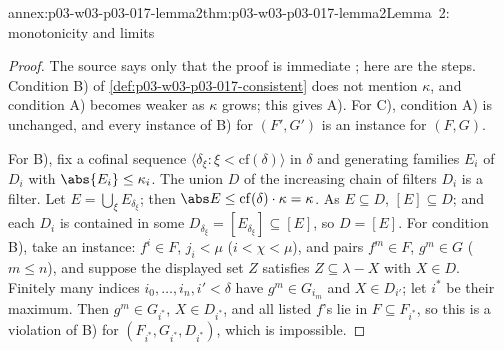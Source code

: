 \begin{annexitem}{annex:p03-w03-p03-017-lemma2}{thm:p03-w03-p03-017-lemma2}{Lemma~2: monotonicity and limits}
\begin{proof}
The source says only that the proof is immediate
\cite[p.~227]{Shelah1971Ultrapowers}; here are the steps.  Condition B) of
\cref{def:p03-w03-p03-017-consistent} does not mention \(\kappa\), and
condition A) becomes weaker as \(\kappa\) grows; this gives A).  For C),
condition A) is unchanged, and every instance of B) for \((F',G')\) is an
instance for \((F,G)\).

For B), fix a cofinal sequence \(\langle\delta_\xi:\xi<\mathrm{cf}(\delta)\rangle\)
in \(\delta\) and generating families \(E_i\) of \(D_i\) with
\(\abs{E_i}\le\kappa_i\).  The union \(D\) of the increasing chain of filters
\(D_i\) is a filter.  Let \(E=\bigcup_\xi E_{\delta_\xi}\); then
\(\abs E\le\mathrm{cf}(\delta)\cdot\kappa=\kappa\).  As \(E\subseteq D\),
\([E]\subseteq D\); and each \(D_i\) is contained in some
\(D_{\delta_\xi}=[E_{\delta_\xi}]\subseteq[E]\), so \(D=[E]\).  For condition
B), take an instance: \(f^i\in F\), \(j_i<\mu\) (\(i<\chi<\mu\)), and pairs
\(f^m\in F\), \(g^m\in G\) (\(m\le n\)), and suppose the displayed set \(Z\)
satisfies \(Z\subseteq\lambda-X\) with \(X\in D\).  Finitely many indices
\(i_0,\ldots,i_n,i'<\delta\) have \(g^m\in G_{i_m}\) and \(X\in D_{i'}\); let
\(i^*\) be their maximum.  Then \(g^m\in G_{i^*}\), \(X\in D_{i^*}\), and all
listed \(f\)'s lie in \(F\subseteq F_{i^*}\), so this is a violation of B) for
\((F_{i^*},G_{i^*},D_{i^*})\), which is impossible.
\end{proof}
\end{annexitem}

